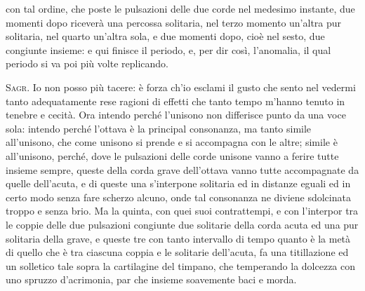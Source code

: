 \documentclass[11pt,twoside,openany]{book}
\newcommand{\speaker}[1]{\textcolor{rubric}{\textsc{#1}}\space}
\begin{document}
con tal ordine, che poste le pulsazioni delle due corde nel medesimo instante, due momenti dopo riceverà una percossa solitaria, nel terzo momento un'altra pur solitaria, nel quarto un'altra sola, e due momenti dopo, cioè nel sesto, due congiunte insieme: e qui finisce il periodo, e, per dir così, l'anomalia, il qual periodo si va poi più volte replicando.

\speaker{Sagr.} Io non posso più tacere: è forza ch'io esclami il gusto che sento nel vedermi tanto adequatamente rese ragioni di effetti che tanto tempo m'hanno tenuto in tenebre e cecità. Ora intendo perché l'unisono non differisce punto da una voce sola: intendo perché l'ottava è la principal consonanza, ma tanto simile all'unisono, che come unisono si prende e si accompagna con le altre; simile è all'unisono, perché, dove le pulsazioni delle corde unisone vanno a ferire tutte insieme sempre, queste della corda grave dell'ottava vanno tutte accompagnate da quelle dell'acuta, e di queste una s'interpone solitaria ed in distanze eguali ed in certo modo senza fare scherzo alcuno, onde tal consonanza ne diviene sdolcinata troppo e senza brio. Ma la quinta, con quei suoi contrattempi, e con l'interpor tra le coppie delle due pulsazioni congiunte due solitarie della corda acuta ed una pur solitaria della grave, e queste tre con tanto intervallo di tempo quanto è la metà di quello che è tra ciascuna coppia e le solitarie dell'acuta, fa una titillazione ed un solletico tale sopra la cartilagine del timpano, che temperando la dolcezza con uno spruzzo d'acrimonia, par che insieme soavemente baci e morda.
\end{document}
